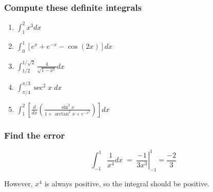 \documentclass[14pt]{beamer}
\begin{document}




	\begin{frame}[t]
		\frametitle{Compute these definite integrals}

		\begin{enumerate}
			\item $\displaystyle \int_{1}^{2}x^{3}dx$
				\vfill

			\item $\displaystyle \int_{0}^{1}\left[ e^{x}+ e^{-x}- \cos (2x) \right] dx$
				\vfill

			\item $\displaystyle \int_{1/2}^{1/\sqrt{2}}\frac{4}{\sqrt{1-x^{2}}}dx$
				\vfill

			\item $\displaystyle \int_{\pi/4}^{\pi/3}\sec^{2}x \; dx$
				\vfill

			\item $\displaystyle \int_{1}^{2}\left[ \frac{d}{dx}\left( \frac{\sin^{2}x }{1
				+ \arctan^{2}x + e^{-x^2}}\right) \right] dx$
				\vfill
		\end{enumerate}
	\end{frame}

	\begin{frame}[t]
		\frametitle{Find the error}

		\[
			\int_{-1}^{1}\frac{1}{x^{4}}dx \; = \; \left. \frac{-1}{3x^{3}}\right\vert_{-1}
			^{1}= \frac{-2}{3}
		\]

		However, $x^{4}$ is always positive, so the integral should be positive.
	\end{frame}
\end{document}

